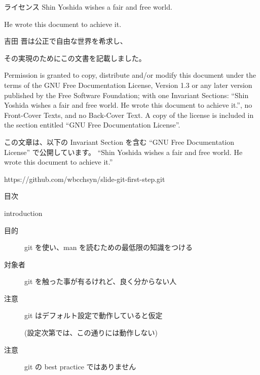 
\begin{frame}{}{}
  \titlepage
\end{frame}

\begin{frame}{ライセンス}{}
Shin Yoshida wishes a fair and free world.

He wrote this document to achieve it.

\vspace{2ex}

吉田 晋は公正で自由な世界を希求し、

その実現のためにこの文書を記載しました。

\vspace{2ex}

{\tiny
Permission is granted to copy, distribute and/or modify this
document under the terms of the GNU Free Documentation License,
Version 1.3 or any later version published by the Free Software
Foundation; with one Invariant Sections: ``Shin Yoshida wishes
a fair and free world. He wrote this document to achieve it.'',
no Front-Cover Texts, and no Back-Cover Text. A copy of the license is
included in the section entitled ``GNU Free Documentation License''.

\vspace{2ex}

この文章は、以下の Invariant Section を含む ``GNU Free Documentation License''
で公開しています。
``Shin Yoshida wishes a fair and free world. He wrote this document to achieve it.''

\vspace{2ex}

https://github.com/wbcchsyn/slide-git-first-step.git
}
\end{frame}

\begin{frame}{目次}{}
  \tableofcontents
\end{frame}

\begin{frame}{introduction}{}

  \begin{description}

  \item[目的] git を使い、man を読むための最低限の知識をつける
  \item[対象者] git を触った事が有るけれど、良く分からない人
  \item[注意] git はデフォルト設定で動作していると仮定

    (設定次第では、この通りには動作しない)
  \item[注意] \alert{git の best practice ではありません}

  \end{description}

\end{frame}
